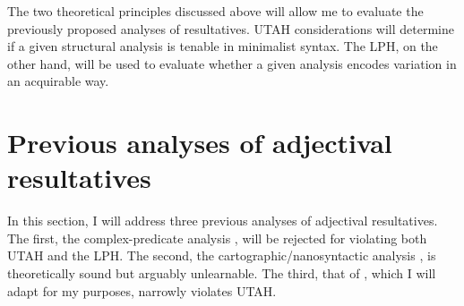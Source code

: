 %
%
%
%
%
%

The two theoretical principles discussed above will allow me to evaluate the previously proposed analyses of resultatives.
UTAH considerations will determine if a given structural analysis is tenable in minimalist syntax.
The LPH, on the other hand, will be used to evaluate whether a given analysis encodes variation in an acquirable way.

\section{Previous analyses of adjectival resultatives}
In this section, I will address three previous analyses of adjectival resultatives.
The first, the complex-predicate analysis \parencite{snyder1995language,irimia2012secondary}, will be rejected for violating both UTAH and the LPH.
The second, the cartographic/nanosyntactic analysis \parencite{son2008microparameters}, is theoretically sound but arguably unlearnable.
The third, that of \textcite{kratzer2004building}, which I will adapt for my purposes, narrowly violates UTAH.

